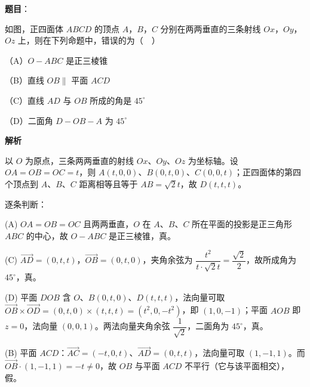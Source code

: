\begin{answer}

\textbf{题目}：

如图，正四面体 $ABCD$ 的顶点 $A$，$B$，$C$ 分别在两两垂直的三条射线 $Ox$，$Oy$，$Oz$ 上，则在下列命题中，错误的为（　）

（A）$O-ABC$ 是正三棱锥

（B）直线 $OB\parallel$ 平面 $ACD$

（C）直线 $AD$ 与 $OB$ 所成的角是 $45^\circ$

（D）二面角 $D-OB-A$ 为 $45^\circ$
\nopagebreak[4]
\begin{center}\end{center}
\nopagebreak[4]
\textbf{解析}

以 $O$ 为原点，三条两两垂直的射线 $Ox$、$Oy$、$Oz$ 为坐标轴。设 $OA=OB=OC=t$，则 $A(t,0,0)$、$B(0,t,0)$、$C(0,0,t)$；正四面体的第四个顶点到 $A$、$B$、$C$ 距离相等且等于 $AB=\sqrt2t$，故 $D(t,t,t)$。

逐条判断：

(A) $OA=OB=OC$ 且两两垂直，$O$ 在 $A$、$B$、$C$ 所在平面的投影是正三角形 $ABC$ 的中心，故 $O-ABC$ 是正三棱锥，真。

(C) $\overrightarrow{AD}=(0,t,t)$，$\overrightarrow{OB}=(0,t,0)$，夹角余弦为 $\dfrac{t^2}{t\cdot\sqrt2t}=\dfrac{\sqrt2}{2}$，故所成角为 $45^\circ$，真。

(D) 平面 $DOB$ 含 $O$、$B(0,t,0)$、$D(t,t,t)$，法向量可取 $\overrightarrow{OB}\times\overrightarrow{OD}=(0,t,0)\times(t,t,t)=(t^2,0,-t^2)$，即 $(1,0,-1)$；平面 $AOB$ 即 $z=0$，法向量 $(0,0,1)$。两法向量夹角余弦 $\dfrac{1}{\sqrt2}$，二面角为 $45^\circ$，真。

(B) 平面 $ACD$：$\overrightarrow{AC}=(-t,0,t)$、$\overrightarrow{AD}=(0,t,t)$，法向量可取 $(1,-1,1)$。而 $\overrightarrow{OB}\cdot(1,-1,1)=-t\neq0$，故 $OB$ 与平面 $ACD$ 不平行（它与该平面相交），假。


\end{answer}
